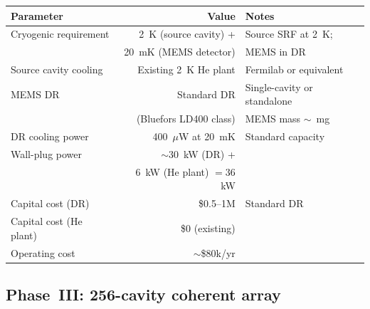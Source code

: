 \documentclass[11pt]{article}
\theoremstyle{definition}
\theoremstyle{remark}
\begin{document}
\begin{center}
\renewcommand{\arraystretch}{1.3}
\begin{tabular}{lrl}
\toprule
Parameter & Value & Notes \\
\midrule
Cryogenic requirement & 2~K (source cavity) + & Source SRF at 2~K; \\
 & 20~mK (MEMS detector) & MEMS in DR \\
Source cavity cooling & Existing 2~K He plant & Fermilab or equivalent \\
MEMS DR & Standard DR & Single-cavity or standalone \\
 & (Bluefors LD400 class) & MEMS mass $\sim$~mg \\
DR cooling power & 400~$\mu$W at 20~mK & Standard capacity \\
Wall-plug power & $\sim$30~kW (DR) + & \\
 & 6~kW (He plant) $= 36$~kW & \\
\midrule
Capital cost (DR) & \$0.5--1M & Standard DR \\
Capital cost (He plant) & \$0 (existing) & \\
Operating cost & $\sim$\$80k/yr & \\
\bottomrule
\end{tabular}
\end{center}

\subsection{Phase~III: 256-cavity coherent array}
\end{document}
